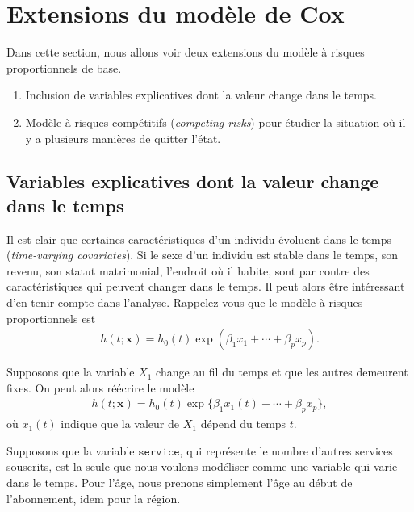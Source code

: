 \documentclass[
  11pt,
  letterpaper,
]{book}
\providecommand{\tightlist}{%
  \setlength{\itemsep}{0pt}\setlength{\parskip}{0pt}}
\theoremstyle{definition}
\theoremstyle{definition}
\theoremstyle{definition}
\theoremstyle{definition}
\theoremstyle{remark}
\begin{document}
\hypertarget{extensions-du-moduxe8le-de-cox}{%
\section{Extensions du modèle de Cox}\label{extensions-du-moduxe8le-de-cox}}

Dans cette section, nous allons voir deux extensions du modèle à risques proportionnels de base.

\begin{enumerate}
\def\labelenumi{\roman{enumi})}
\tightlist
\item
  Inclusion de variables explicatives dont la valeur change dans le temps.
\item
  Modèle à risques compétitifs (\emph{competing risks}) pour étudier la situation où il y a plusieurs manières de quitter l'état.
\end{enumerate}

\hypertarget{variables-explicatives-dont-la-valeur-change-dans-le-temps}{%
\subsection{Variables explicatives dont la valeur change dans le temps}\label{variables-explicatives-dont-la-valeur-change-dans-le-temps}}

Il est clair que certaines caractéristiques d'un individu évoluent dans le temps (\emph{time-varying covariates}). Si le sexe d'un individu est stable dans le temps, son revenu, son statut matrimonial, l'endroit où il habite, sont par contre des caractéristiques qui peuvent changer dans le temps. Il peut alors être intéressant d'en tenir compte dans l'analyse. Rappelez-vous que le modèle à risques proportionnels est
\begin{align*}
h(t; \boldsymbol{x}) = h_0(t) \exp(\beta_1x_1 + \cdots + \beta_px_p).
\end{align*}

Supposons que la variable \(X_1\) change au fil du temps et que les autres demeurent fixes. On peut alors réécrire le modèle
\begin{align*}
h(t; \boldsymbol{x}) = h_0(t) \exp\{\beta_1x_1(t) + \cdots + \beta_px_p\},
\end{align*}
où \(x_1(t)\) indique que la valeur de \(X_1\) dépend du temps \(t\).

Supposons que la variable \(\texttt{service}\), qui représente le nombre d'autres services souscrits, est la seule que nous voulons modéliser comme une variable qui varie dans le temps. Pour l'âge, nous prenons simplement l'âge au début de l'abonnement, idem pour la région.
\end{document}

